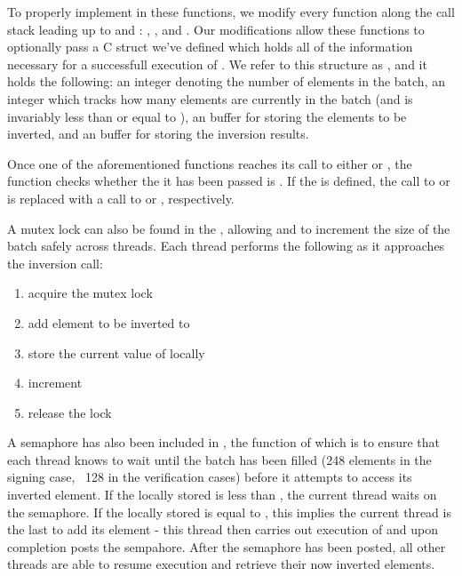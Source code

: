 \begin{figure}[!h]
\begin{tikzpicture}
\end{tikzpicture}
\end{figure}

To properly implement  in these functions, we modify every function along the call stack leading up to  and : , , and . Our modifications allow these functions to optionally pass a C struct we've defined which holds all of the information necessary for a successfull execution of . We refer to this structure as , and it holds the following: an integer  denoting the number of elements in the batch, an integer  which tracks how many elements are currently in the batch (and is invariably less than or equal to ), an  buffer  for storing the elements to be inverted, and an  buffer  for storing the inversion results.

Once one of the aforementioned  functions reaches its call to either  or , the function checks whether the  it has been passed is . If the  is defined, the call to  or  is replaced with a call to  or , respectively.

A mutex lock can also be found in the , allowing  and  to increment the size of the batch safely across threads. Each thread performs the following as it approaches the inversion call:
\begin{enumerate}
\item acquire the mutex lock
\item add element to be inverted to 
\item store the current value of  locally
\item increment 
\item release the lock
\end{enumerate}

A semaphore has also been included in , the function of which is to ensure that each thread knows to wait until the batch has been filled (248 elements in the signing case, ~128 in the verification cases) before it attempts to access its inverted element. If the locally stored  is less than , the current thread waits on the semaphore. If the locally stored  is equal to , this implies the current thread is the last to add its element - this thread then carries out execution of  and upon completion posts the sempahore. After the semaphore has been posted, all other threads are able to resume execution and retrieve their now inverted elements. 

